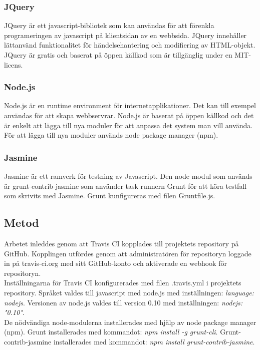 \subsubsection{JQuery}
JQuery är ett javascript-bibliotek som kan användas för att förenkla programeringen
av javascript på klientsidan av en webbsida. JQuery innehåller lättanvänd
funktionalitet för händelsehantering och modifiering av HTML-objekt.
JQuery är gratis och baserat på öppen källkod som är tillgänglig under en
MIT-licens.

\subsubsection{Node.js}
Node.js är en runtime environment för internetapplikationer. Det kan till exempel 
användas för att skapa webbservrar.
Node.js är baserat på öppen källkod och det är enkelt att lägga till nya 
moduler för att anpassa det system man vill
använda. För att lägga till nya moduler används node package manager (npm).

\subsubsection{Jasmine}
Jasmine är ett ramverk för testning av Javascript. 
Den node-modul som används är grunt-contrib-jasmine som använder task runnern Grunt 
för att köra testfall som skrivits med Jasmine.
Grunt kunfigureras med filen Gruntfile.js.

\subsection{Metod}
Arbetet inleddes genom att Travis CI kopplades till projektets repository på GitHub.
Kopplingen utfördes
genom att administratören för repositoryn loggade in på travis-ci.org med 
sitt GitHub-konto och aktiverade
en webhook för repositoryn.\\

Inställningarna för Travis CI konfigurerades med filen .travis.yml i projektets
repository. Språket valdes till
javascript med node.js med inställningen: \emph{language: node\textunderscore js}.
Versionen av node.js valdes till version 0.10
med inställningen: \emph{node\textunderscore js: "0.10"}.\\

De nödvändiga node-modulerna installerades med hjälp av node package manager (npm).
Grunt installerades
med kommandot: \emph{npm install -g grunt-cli}. Grunt-contrib-jasmine installerades med kommandot: 
\emph{npm install grunt-contrib-jasmine}.\\

